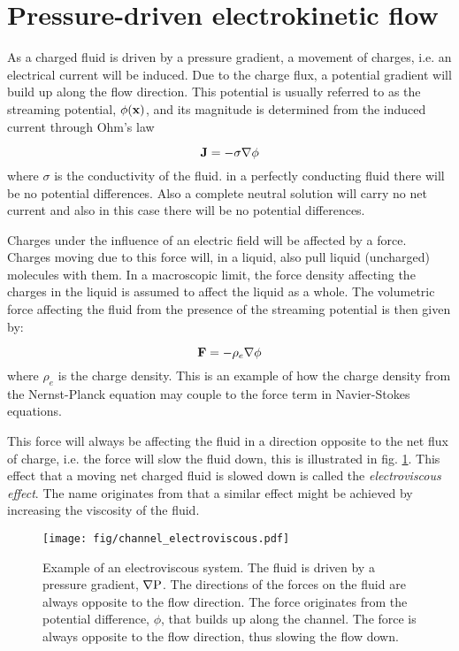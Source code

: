 \section{Pressure-driven electrokinetic flow}\label{sec:et:streaming_pot}
As a charged fluid is driven by a pressure gradient, a movement of
charges, i.e. an electrical current will be induced. Due to the charge
flux, a potential gradient will build up along the flow
direction. This potential is usually referred to as the streaming
potential, $\phi(\mathbf{x})$, and its magnitude is determined from the
induced current through Ohm's law

\begin{equation}
\mathbf{J} = -  \sigma \nabla \phi  
\end{equation}   
where $\sigma$ is the conductivity of the fluid. in a perfectly
conducting fluid there will be no potential differences. Also a
complete neutral solution will carry no net current and also in this
case there will be no potential differences.

Charges under the influence of an electric field will be affected by a
force. Charges moving due to this force will, in a liquid, also pull
liquid (uncharged) molecules with them. In a macroscopic limit, the
force density affecting the charges in the liquid is assumed to affect
the liquid as a whole. The volumetric force affecting the fluid from
the presence of the streaming potential is then given by:

\begin{equation}
\mathbf{F} = - \rho_e \nabla \phi
\end{equation}
where $\rho_e$ is the charge density. This is an example of how the
charge density from the Nernst-Planck equation may couple to the force
term in Navier-Stokes equations. 

This force will always be affecting the fluid in a direction opposite
to the net flux of charge, i.e. the force will slow the fluid down,
this is illustrated in fig. \ref{fig:et:ev}. This effect that a moving
net charged fluid is slowed down is called the \emph{electroviscous
  effect}. The name originates from that a similar effect might be
achieved by increasing the viscosity of the fluid.

\begin{figure}
\begin{center}
\texttt{[image: fig/channel\_electroviscous.pdf]}
\end{center}
\caption[Example of an electroviscous system.]{Example of an
  electroviscous system. The fluid is driven by a pressure gradient,
  $\nabla \mathrm{P}$. The directions of the forces on the fluid are always
  opposite to the flow direction. The force originates from the
  potential difference, $\phi$, that builds up along the channel. The
  force is always opposite to the flow direction, thus slowing the
  flow down.}
\label{fig:et:ev}
\end{figure}
